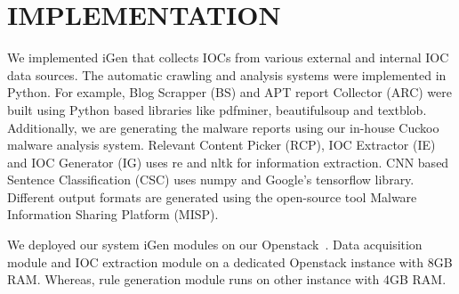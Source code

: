 \chapter{IMPLEMENTATION}
\label{implementation}
We implemented iGen that collects IOCs from various external and internal IOC data sources. The automatic crawling and analysis systems were implemented in Python. For example, Blog Scrapper (BS) and APT report Collector (ARC) were built using Python based libraries like pdfminer, beautifulsoup and textblob. Additionally, we are generating the malware reports using our in-house Cuckoo malware analysis system. Relevant Content Picker (RCP), IOC Extractor (IE) and IOC Generator (IG) uses re and nltk for information extraction. CNN based Sentence Classification (CSC) uses numpy and Google's tensorflow library. Different output formats are generated using the open-source tool Malware Information Sharing Platform (MISP). 

We deployed our system iGen modules on our Openstack~\cite{openstack}. Data acquisition module and IOC extraction module on a dedicated Openstack instance with 8GB RAM. Whereas, rule generation module runs on other instance with 4GB RAM. 